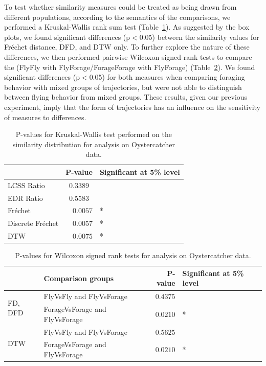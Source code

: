 \documentclass{interact}
\begin{document}
To test whether similarity measures could be treated as being drawn from different populations, according to the semantics of the comparisons, we performed a Kruskal-Wallis rank sum test (Table~\ref{tab:kruskal_wallis}). As suggested by the box plots, we found significant differences (p$<$0.05) between the similarity values for Fréchet distance, DFD, and DTW only. To further explore the nature of these differences, we then performed pairwise Wilcoxon signed rank tests to compare the (FlyFly with FlyForage/ForageForage with FlyForage) (Table~\ref{tab:wilcoxon_oyster}). We found significant differences (p$<$0.05) for both measures when comparing foraging behavior with mixed groups of trajectories, but were not able to distinguish between flying behavior from mixed groups. These results, given our previous experiment, imply that the form of trajectories has an influence on the sensitivity of measures to differences.

\begin{table}[ht]
	\centering
	\caption{P-values for Kruskal-Wallis test performed on the similarity distribution for analysis on Oystercatcher data.}
	\begin{tabular}{l|rl}
		& P-value& Significant at 5\% level\\ \hline
		LCSS Ratio & $0.3389$\  \\
		\rowcolor{gray!15} EDR Ratio & $0.5583$\ & \\
		Fréchet & $0.0057$ & * \\
		\rowcolor{gray!15} Discrete Fréchet & $0.0057$ & * \\
		DTW & $0.0075$ &* \\
	\end{tabular}
	\label{tab:kruskal_wallis}
\end{table}

\begin{table}[ht]
	\centering
	\caption{P-values for Wilcoxon signed rank tests for analysis on Oystercatcher data.}
	\begin{tabular}{l|lrl}
		& Comparison groups & P-value& Significant at 5\% level\\ \hline
		\multirow{2}{*}{FD, DFD} & {FlyVsFly and FlyVsForage} & $0.4375$ & \\
		&  {ForageVsForage and FlyVsForage} & $0.0210$ & *\\ \hline
		\multirow{2}{*}{DTW} & {FlyVsFly and FlyVsForage} & $0.5625$ & \\ 	
		& {ForageVsForage and FlyVsForage} & $0.0210$ & *\\ 	
	\end{tabular}
	\label{tab:wilcoxon_oyster}
\end{table}
\end{document}
